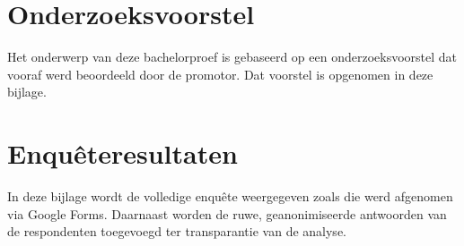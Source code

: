 \documentclass[dutch,dit,thesis]{hogentreport}
\begin{document}










\appendix

\chapter{Onderzoeksvoorstel}

Het onderwerp van deze bachelorproef is gebaseerd op een onderzoeksvoorstel dat vooraf werd beoordeeld door de promotor. Dat voorstel is opgenomen in deze bijlage.



\chapter{Enquêteresultaten}

In deze bijlage wordt de volledige enquête weergegeven zoals die werd afgenomen via Google Forms. Daarnaast worden de ruwe, geanonimiseerde antwoorden van de respondenten toegevoegd ter transparantie van de analyse.

\clearpage



\backmatter{}

\setlength\bibitemsep{2pt} %
\printbibliography[heading=bibintoc]
\end{document}
